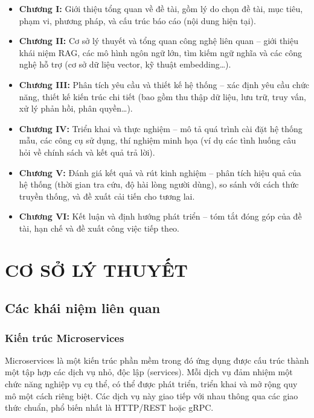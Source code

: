 \documentclass[12pt,a4paper]{report}
\begin{document}
\begin{itemize}
    \item \textbf{Chương I:} Giới thiệu tổng quan về đề tài, gồm lý do chọn đề tài, mục tiêu, phạm vi, phương pháp, và cấu trúc báo cáo (nội dung hiện tại).
    \item \textbf{Chương II:} Cơ sở lý thuyết và tổng quan công nghệ liên quan – giới thiệu khái niệm RAG, các mô hình ngôn ngữ lớn, tìm kiếm ngữ nghĩa và các công nghệ hỗ trợ (cơ sở dữ liệu vector, kỹ thuật embedding…).
    \item \textbf{Chương III:} Phân tích yêu cầu và thiết kế hệ thống – xác định yêu cầu chức năng, thiết kế kiến trúc chi tiết (bao gồm thu thập dữ liệu, lưu trữ, truy vấn, xử lý phản hồi, phân quyền…).
    \item \textbf{Chương IV:} Triển khai và thực nghiệm – mô tả quá trình cài đặt hệ thống mẫu, các công cụ sử dụng, thí nghiệm minh họa (ví dụ các tình huống câu hỏi về chính sách và kết quả trả lời).
    \item \textbf{Chương V:} Đánh giá kết quả và rút kinh nghiệm – phân tích hiệu quả của hệ thống (thời gian tra cứu, độ hài lòng người dùng), so sánh với cách thức truyền thống, và đề xuất cải tiến cho tương lai.
    \item \textbf{Chương VI:} Kết luận và định hướng phát triển – tóm tắt đóng góp của đề tài, hạn chế và đề xuất công việc tiếp theo.
\end{itemize}

\clearpage

\chapter{CƠ SỞ LÝ THUYẾT}

\section{Các khái niệm liên quan}

\subsection{Kiến trúc Microservices}
Microservices là một kiến trúc phần mềm trong đó ứng dụng được cấu trúc thành một tập hợp các dịch vụ nhỏ, độc lập (services). Mỗi dịch vụ đảm nhiệm một chức năng nghiệp vụ cụ thể, có thể được phát triển, triển khai và mở rộng quy mô một cách riêng biệt. Các dịch vụ này giao tiếp với nhau thông qua các giao thức chuẩn, phổ biến nhất là HTTP/REST hoặc gRPC.
\end{document}
